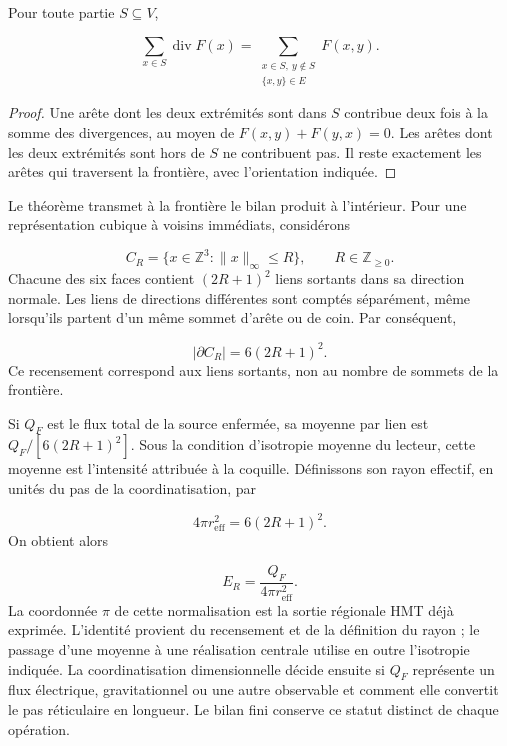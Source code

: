 \begin{theorem}
\label{vi:thm:gauss}
Pour toute partie $S\subseteq V$,

\begin{equation}
 \sum_{x\in S}\operatorname{div}F(x)
 =\sum_{\substack{x\in S,\ y\notin S\\\{x,y\}\in E}}F(x,y).
 \label{vi:eq:gauss}
\end{equation}
\end{theorem}
\begin{proof}
Une arête dont les deux extrémités sont dans $S$ contribue deux fois à la
somme des divergences, au moyen de $F(x,y)+F(y,x)=0$. Les arêtes
dont les deux extrémités sont hors de $S$ ne contribuent pas. Il reste
exactement les arêtes qui traversent la frontière, avec
l’orientation indiquée.

\end{proof}

Le théorème transmet à la frontière le bilan produit à
l’intérieur. Pour une représentation cubique à voisins immédiats,
considérons

\[
 C_R=\{x\in\mathbb Z^3:\|x\|_\infty\leq R\},
 \qquad R\in\mathbb Z_{\geq0}.
\]
Chacune des six faces contient $(2R+1)^2$ liens
sortants dans sa direction normale. Les liens de directions
différentes sont comptés séparément, même lorsqu’ils partent
d’un même sommet d’arête ou de coin. Par conséquent,

\begin{equation}
 |\partial C_R|=6(2R+1)^2.
 \label{vi:eq:frontera-cubica}
\end{equation}
Ce recensement correspond aux liens sortants, non au nombre de
sommets de la frontière.


Si $Q_F$ est le flux total de la source enfermée, sa moyenne
par lien est $Q_F/[6(2R+1)^2]$. Sous la condition d’isotropie
moyenne du lecteur, cette moyenne est l’intensité attribuée à la
coquille. Définissons son rayon effectif, en unités du pas de
la coordinatisation, par

\begin{equation}
 4\pi r_{\mathrm{eff}}^2=6(2R+1)^2.
 \label{vi:eq:radio-efectivo}
\end{equation}
On obtient alors

\begin{equation}
 E_R=\frac{Q_F}{4\pi r_{\mathrm{eff}}^2}.
 \label{vi:eq:inverso-area}
\end{equation}
La coordonnée $\pi$ de cette normalisation est la sortie régionale
HMT déjà exprimée. L’identité provient du recensement et de la
définition du rayon ; le passage d’une moyenne à une réalisation
centrale utilise en outre l’isotropie indiquée. La coordinatisation
dimensionnelle décide ensuite si $Q_F$ représente un flux électrique,
gravitationnel ou une autre observable et comment elle convertit le pas
réticulaire en longueur. Le bilan fini conserve ce
statut distinct de chaque opération.


